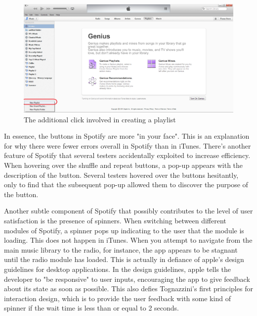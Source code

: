 \documentclass[12pt]{report}
\begin{document}
\begin{figure}[H]
	\centering
	\includegraphics[width=.75\textwidth]{chart9.png}
	\caption{The additional click involved in creating a 
playlist}
\end{figure}


 In essence, the buttons in Spotify are more "in your face". This 
is an explanation for why there were fewer errors overall in 
Spotify than in iTunes. There's another feature of Spotify that 
several testers accidentally exploited to increase efficiency. 
When hovering over the shuffle and repeat buttons, a pop-up 
appears with the description of the button. Several testers 
hovered over the buttons hesitantly, only to find that the 
subsequent pop-up allowed them to discover the purpose of the 
button.

Another subtle component of Spotify that possibly contributes to 
the level of user satisfaction is the presence of spinners. When 
switching between different modules of Spotify, a spinner pops up 
indicating to the user that the module is loading. This does not 
happen in iTunes. When you attempt to navigate from the main music 
library to the radio, for instance, the app appears to be stagnant 
until the radio module has loaded. This is actually in defiance of 
apple's design guidelines  for desktop applications. In the design 
guidelines, apple tells the developer to  "be responsive" to user 
inputs, encouraging the app to give feedback about its state as 
soon as possible. This also defies Tognazzini's first principles 
for interaction design, which is to provide the user feedback with 
some kind of spinner if the wait time is less than or equal to 2 
seconds.
\end{document}
